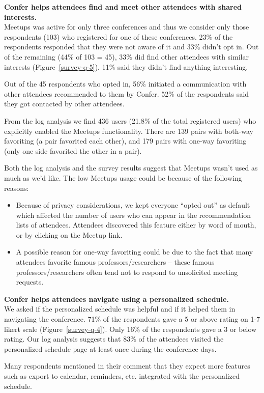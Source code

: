 \documentclass{sigchi}
\begin{document}
\textbf{Confer helps attendees find and meet other attendees with shared interests.}\\
Meetups was active for only three conferences and thus we consider only those respondents (103) who registered for one of these conferences. 23\% of the respondents responded that they were not aware of it and 33\% didn't opt in. Out of the remaining (44\% of 103 = 45), 33\% did find other attendees with similar interests (Figure~\ref{survey-q-5}). 11\% said they didn't find anything interesting.

Out of the 45 respondents who opted in, 56\% initiated a communication with other attendees recommended to them by Confer. 52\% of the respondents said they got contacted by other attendees.

From the log analysis we find 436 users (21.8\% of the total registered users) who explicitly enabled the Meetups functionality. There are 139 pairs with both-way favoriting (a pair favorited each other), and 179 pairs with one-way favoriting (only one side favorited the other in a pair).

Both the log analysis and the survey results suggest that Meetups wasn't used as much as we'd like. The low Meetups usage could be because of the following reasons: 
\begin{itemize}
\item Because of privacy considerations, we kept everyone ``opted out'' as default which affected the number of users who can appear in the recommendation lists of attendees. Attendees discovered this feature either by word of mouth, or by clicking on the Meetup link.
\item A possible reason for one-way favoriting could be due to the fact that many attendees favorite famous professors/researchers -- these famous professors/researchers often tend not to respond to unsolicited meeting requests.
\end {itemize}

\textbf{Confer helps attendees navigate using a personalized schedule.}\\
We asked if the personalized schedule was helpful and if it helped them in navigating the conference. 71\% of the respondents gave a 5 or above rating on 1-7 likert scale (Figure~\ref{survey-q-4}). Only 16\% of the respondents gave a 3 or below rating. Our log analysis suggests that 83\% of the attendees visited the personalized schedule page at least once during the conference days.

Many respondents mentioned in their comment that they expect more features such as export to calendar, reminders, etc. integrated with the personalized schedule.
\end{document}
